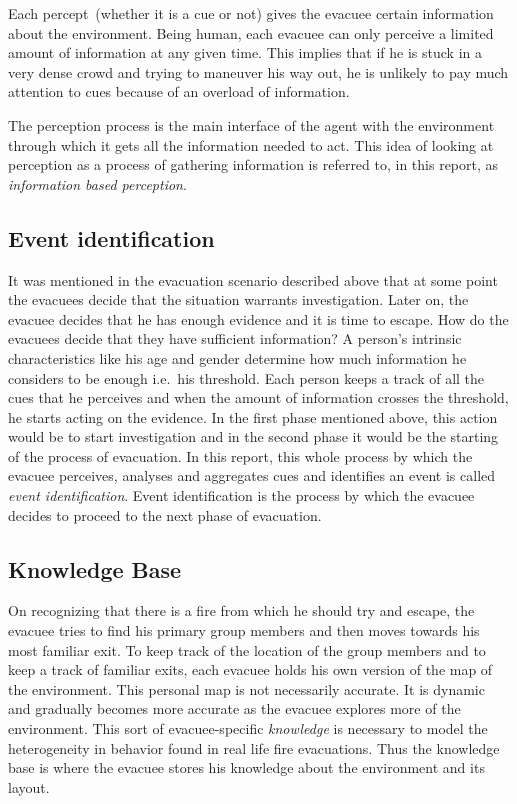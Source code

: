	Each percept~(whether it is a cue or not) gives the evacuee certain information about the environment. Being human, each evacuee can only perceive a limited amount of information at any given time. This implies that if he is stuck in a very dense crowd and trying to maneuver his way out, he is unlikely to pay much attention to cues because of an overload of information.

	The perception process is the main interface of the agent with the environment through which it gets all the information needed to act. This idea of looking at perception as a process of gathering information is referred to, in this report, as \emph{information based perception}.

\subsection{Event identification} %
\label{IBEVAC:EventIdentification}
	It was mentioned in the evacuation scenario described above that at some point the evacuees decide that the situation warrants investigation. Later on, the evacuee decides that he has enough evidence and it is time to escape. How do the evacuees decide that they have sufficient information? A person's intrinsic characteristics like his age and gender determine how much information he considers to be enough i.e.\ his threshold. Each person keeps a track of all the cues that he perceives and when the amount of information crosses the threshold, he starts acting on the evidence. In the first phase mentioned above, this action would be to start investigation and in the second phase it would be the starting of the process of evacuation. In this report, this whole process by which the evacuee perceives, analyses and aggregates cues and identifies an event is called \emph{event identification}. Event identification is the process by which the evacuee decides to proceed to the next phase of evacuation.

\subsection{Knowledge Base}
\label{IBEVAC:Knowledge}
	On recognizing that there is a fire from which he should try and escape, the evacuee tries to find his primary group members and then moves towards his most familiar exit. To keep track of the location of the group members and to keep a track of familiar exits, each evacuee holds his own version of the map of the environment. This personal map is not necessarily accurate. It is dynamic and gradually becomes more accurate as the evacuee explores more of the environment. This sort of evacuee-specific \emph{knowledge} is necessary to model the heterogeneity in behavior found in real life fire evacuations. Thus the knowledge base is where the evacuee stores his knowledge about the environment and its layout.

